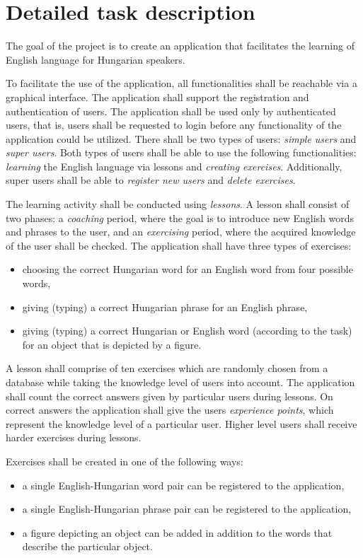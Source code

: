 \documentclass[a4paper]{article}
\begin{document}
	\section{Detailed task description}
	The goal of the project is to create an application that facilitates the learning of English language for Hungarian speakers.
	
	To facilitate the use of the application, all functionalities shall be reachable via a graphical interface. The application shall support the registration and authentication of users. The application shall be used only by authenticated users, that is,  users shall be requested to login before any functionality of the application could be utilized. There shall be two types of users: \textsl{simple users} and \textsl{super users}. Both types of users shall be able to use the following functionalities: \emph{learning} the English language via lessons and \emph{creating exercises}. Additionally, super users shall be able to \emph{register new users} and \emph{delete exercises}.
	
	The learning activity shall be conducted using \emph{lessons}. A lesson shall consist of two phases: a \emph{coaching} period, where the goal is to introduce new English words and phrases to the user, and an \emph{exercising} period, where the acquired knowledge of the user shall be checked. The application shall have three types of exercises:
	\begin{itemize}
		\item choosing the correct Hungarian word for an English word from four possible words,
		\item giving (typing) a correct Hungarian phrase for an English phrase,
		\item giving (typing) a correct Hungarian or English word (according to the task) for an object that is depicted by a figure.
	\end{itemize}
	A lesson shall comprise of ten exercises which are randomly chosen from a database while taking the knowledge level of users into account. The application shall count the correct answers given by particular users during lessons. On correct answers the application shall give the users \emph{experience points}, which represent the knowledge level of a particular user. Higher level users shall receive harder exercises during lessons. 

	Exercises shall be created in one of the following ways:
	\begin{itemize}
		\item a single English-Hungarian word pair can be registered to the application,
		\item a single English-Hungarian phrase pair can be registered to the application,
		\item a figure depicting an object can be added in addition to the words that describe the particular object.
	\end{itemize}
	
\end{document}

